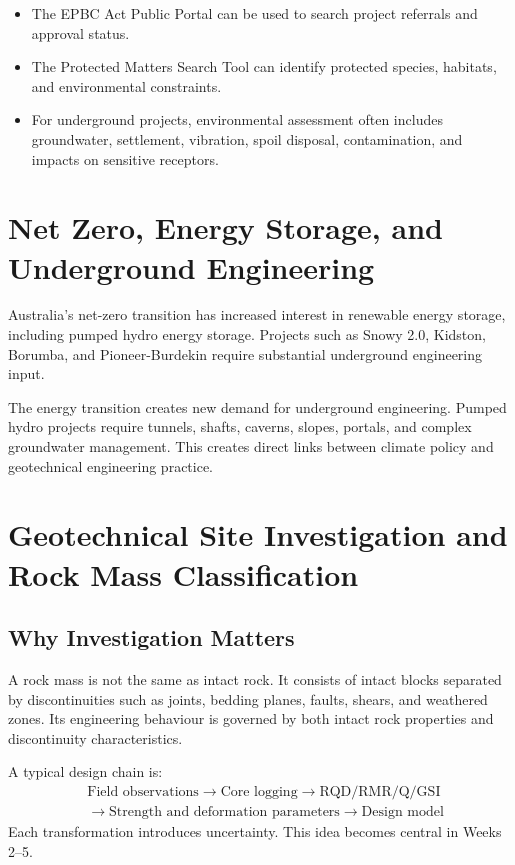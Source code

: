 \documentclass[a4paper,12pt]{article}
\begin{document}
\begin{itemize}
    \item The EPBC Act Public Portal can be used to search project referrals and approval status.
    \item The Protected Matters Search Tool can identify protected species, habitats, and environmental constraints.
    \item For underground projects, environmental assessment often includes groundwater, settlement, vibration, spoil disposal, contamination, and impacts on sensitive receptors.
\end{itemize}

\section{Net Zero, Energy Storage, and Underground Engineering}

Australia's net-zero transition has increased interest in renewable energy storage, including pumped hydro energy storage. Projects such as Snowy 2.0, Kidston, Borumba, and Pioneer-Burdekin require substantial underground engineering input.

\begin{keybox}
The energy transition creates new demand for underground engineering. Pumped hydro projects require tunnels, shafts, caverns, slopes, portals, and complex groundwater management. This creates direct links between climate policy and geotechnical engineering practice.
\end{keybox}

\section{Geotechnical Site Investigation and Rock Mass Classification}

\subsection{Why Investigation Matters}
A rock mass is not the same as intact rock. It consists of intact blocks separated by discontinuities such as joints, bedding planes, faults, shears, and weathered zones. Its engineering behaviour is governed by both intact rock properties and discontinuity characteristics.

\begin{notebox}
A typical design chain is:
\[
\begin{aligned}
&\text{Field observations} \rightarrow \text{Core logging}
\rightarrow \text{RQD/RMR/Q/GSI} \\
&\rightarrow \text{Strength and deformation parameters}
\rightarrow \text{Design model}
\end{aligned}
\]
Each transformation introduces uncertainty. This idea becomes central in Weeks 2--5.
\end{notebox}
\end{document}
